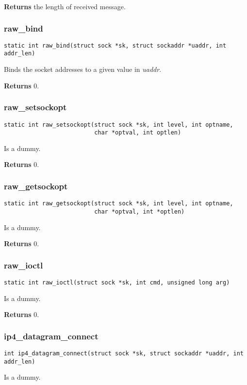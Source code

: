 \documentclass[12pt,a4paper]{article}
\begin{document}
{\bf Returns} the length of received message.

\subsubsection{raw\_bind}
\label{sec:raw_sock_raw_bind}
\begin{verbatim}
static int raw_bind(struct sock *sk, struct sockaddr *uaddr, int addr_len)
\end{verbatim}
Binds the socket addresses to a given value in {\it uaddr}.

{\bf Returns} 0.

\subsubsection{raw\_setsockopt}
\label{sec:raw_sock_raw_setsockopt}
\begin{verbatim}
static int raw_setsockopt(struct sock *sk, int level, int optname,
                          char *optval, int optlen)
\end{verbatim}
Is a dummy.

{\bf Returns} 0.

\subsubsection{raw\_getsockopt}
\label{sec:raw_sock_raw_getsockopt}
\begin{verbatim}
static int raw_getsockopt(struct sock *sk, int level, int optname,
                          char *optval, int *optlen)
\end{verbatim}
Is a dummy.

{\bf Returns} 0.

\subsubsection{raw\_ioctl}
\label{sec:raw_sock_raw_ioctl}
\begin{verbatim}
static int raw_ioctl(struct sock *sk, int cmd, unsigned long arg)
\end{verbatim}
Is a dummy.

{\bf Returns} 0.

\subsubsection{ip4\_datagram\_connect}
\label{sec:raw_sock_ip4_datagram_connect}
\begin{verbatim}
int ip4_datagram_connect(struct sock *sk, struct sockaddr *uaddr, int addr_len)
\end{verbatim}
Is a dummy.
\end{document}
